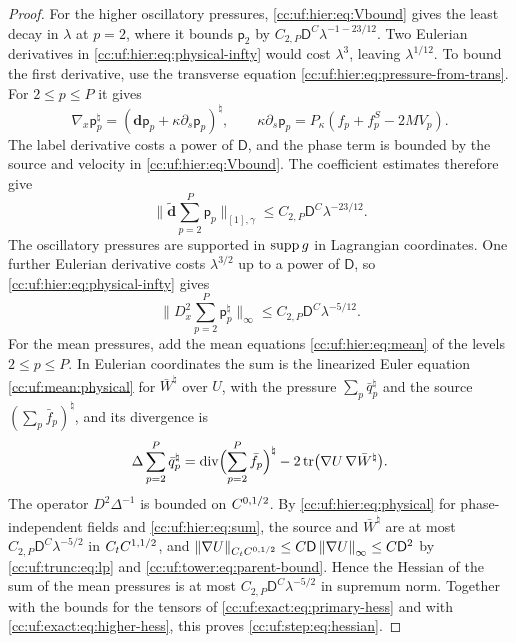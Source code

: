 \begin{proof}
For the higher oscillatory pressures, \eqref{cc:uf:hier:eq:Vbound}
gives the least decay in $\lambda$ at $p=2$, where it bounds
$\mathsf p_2$ by $C_{2,P}\mathsf D^C\lambda^{-1-23/12}$.
Two Eulerian derivatives in \eqref{cc:uf:hier:eq:physical-infty}
would cost $\lambda^3$, leaving $\lambda^{1/12}$. To bound the first
derivative, use the transverse equation \eqref{cc:uf:hier:eq:pressure-from-trans}.
For $2\le p\le P$ it gives
\[
 \nabla_x\mathsf p_p^\natural
   =(\mathbf d\mathsf p_p+\kappa\partial_s\mathsf p_p)^\natural,
 \qquad
 \kappa\partial_s\mathsf p_p=P_\kappa(f_p+f_p^S-2MV_p).
\]
The label derivative costs a power of $\mathsf D$, and the phase term
is bounded by the source and velocity in \eqref{cc:uf:hier:eq:Vbound}.
The coefficient estimates therefore give
\[
 \Big\|\widetilde{\mathbf d}\sum_{p=2}^P\mathsf p_p\Big\|_{[1],\gamma}
 \le C_{2,P}\mathsf D^C\lambda^{-23/12}.
\]
The oscillatory pressures are supported in $\operatorname{supp} g$ in Lagrangian coordinates.
One further Eulerian derivative costs $\lambda^{3/2}$ up to a power
of $\mathsf D$, so \eqref{cc:uf:hier:eq:physical-infty} gives
\begin{equation}\label{cc:uf:exact:eq:higher-hess}
 \Big\|D_x^2\sum_{p=2}^P\mathsf p_p^\natural\Big\|_\infty
 \le C_{2,P}\mathsf D^C\lambda^{-5/12}.
\end{equation}
For the mean pressures, add the mean equations
\eqref{cc:uf:hier:eq:mean} of the levels $2\le p\le P$. In Eulerian coordinates the
sum is the linearized Euler equation \eqref{cc:uf:mean:physical} for
$\bar W^\natural$ over $U$, with the pressure
$\sum_p\bar q_p^\natural$ and the source $(\sum_p\bar f_p)^\natural$,
and its divergence is
\[
 \Delta\sum_{p=2}^P\bar q_p^\natural
 =\operatorname{div}\Bigl(\sum_{p=2}^P\bar f_p\Bigr)^\natural
  -2\operatorname{tr}\bigl(\nabla U\,\nabla\bar W^\natural\bigr).
\]
The operator $D^2\Delta^{-1}$ is bounded on $C^{0,1/2}$. By
\eqref{cc:uf:hier:eq:physical} for phase-independent fields and
\eqref{cc:uf:hier:eq:sum}, the source and $\bar W^\natural$ are at most
$C_{2,P}\mathsf D^C\lambda^{-5/2}$ in $C_tC^{1,1/2}$, and
$\|\nabla U\|_{C_tC^{0,1/2}}\le C\mathsf D\left\lVert\nabla U\right\rVert_\infty
\le C\mathsf D^2$ by \eqref{cc:uf:trunc:eq:lp} and
\eqref{cc:uf:tower:eq:parent-bound}. Hence the Hessian of the
sum of the mean pressures is at most
$C_{2,P}\mathsf D^C\lambda^{-5/2}$ in supremum norm. Together with the
bounds for the tensors of \eqref{cc:uf:exact:eq:primary-hess} and with
\eqref{cc:uf:exact:eq:higher-hess}, this proves
\eqref{cc:uf:step:eq:hessian}.


\end{proof}
